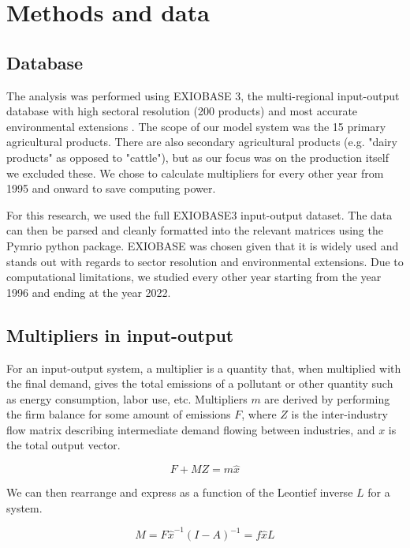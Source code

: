 \documentclass[a4paper,twoside]{article}
\begin{document}
\section{Methods and data}

\subsection{Database}

The analysis was performed using EXIOBASE 3, the multi-regional input-output database with high sectoral resolution (200 products) and most accurate environmental extensions \cite{Stadler2018}. The scope of our model system was the 15 primary agricultural products. There are also secondary agricultural products (e.g. "dairy products" as opposed to "cattle"), but as our focus was on the production itself we excluded these. We chose to calculate multipliers for every other year from 1995 and onward to save computing power. 

For this research, we used the full EXIOBASE3 input-output dataset. The data can then be parsed and cleanly formatted into the relevant matrices using the Pymrio python package. EXIOBASE was chosen given that it is widely used and stands out with regards to sector resolution and environmental extensions. Due to computational limitations, we studied every other year starting from the year 1996 and ending at the year 2022.


\subsection{Multipliers in input-output}

For an input-output system, a multiplier is a quantity that, when multiplied with the final demand, gives the total emissions of a pollutant or other quantity such as energy consumption, labor use, etc. Multipliers $m$ are derived by performing the firm balance for some amount of emissions $F$, where $Z$ is the inter-industry flow matrix describing intermediate demand flowing between industries, and $x$ is the total output vector.

\begin{equation}
F + M Z = m \hat{x}
\end{equation}

We can then rearrange and express as a function of the Leontief inverse $L$ for a system.

\begin{equation}
M = F \hat{x}^{-1} (I - A)^{-1} = f \hat{x} L
\end{equation}
\end{document}
